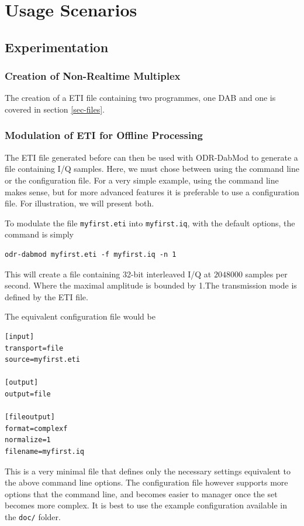 \section{Usage Scenarios}
\subsection{Experimentation}
\subsubsection{Creation of Non-Realtime Multiplex}
The creation of a ETI file containing two programmes, one DAB and one
\dabplus{} is covered in section \ref{sec-files}.

\subsubsection{Modulation of ETI for Offline Processing}
The ETI file generated before can then be used with ODR-DabMod to generate a
file containing I/Q samples. Here, we must chose between using the command line
or the configuration file. For a very simple example, using the command line
makes sense, but for more advanced features it is preferable to use a
configuration file. For illustration, we will present both.

To modulate the file \texttt{myfirst.eti} into \texttt{myfirst.iq}, with the
default options, the command is simply

\begin{lstlisting}
odr-dabmod myfirst.eti -f myfirst.iq -n 1
\end{lstlisting}

This will create a file containing 32-bit interleaved I/Q at $2048000$ samples
per second. Where the maximal amplitude is bounded by 1.The transmission mode
is defined by the ETI file.

The equivalent configuration file would be
\begin{lstlisting}
[input]
transport=file
source=myfirst.eti

[output]
output=file

[fileoutput]
format=complexf
normalize=1
filename=myfirst.iq
\end{lstlisting}

This is a very minimal file that defines only the necessary settings equivalent
to the above command line options. The configuration file however supports more
options that the command line, and becomes easier to manager once the set
becomes more complex. It is best to use the example configuration available in
the \texttt{doc/} folder.

